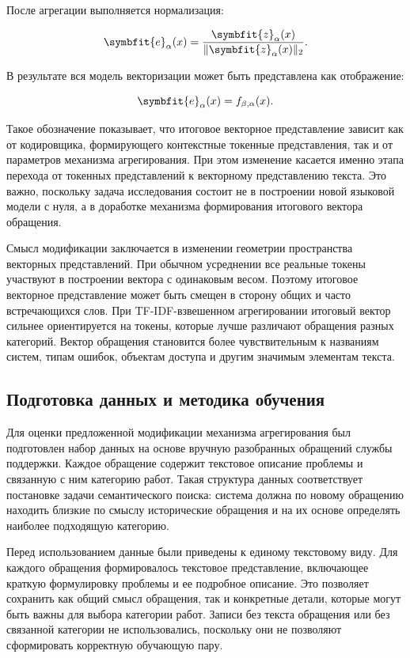 \documentclass[14pt,a4paper]{extarticle}
\numberwithin{figure}{section}
\numberwithin{table}{section}
\begin{document}
После агрегации выполняется нормализация:

\begin{equation}\symbfit{e}_{\alpha}(x)=\frac{\symbfit{z}_{\alpha}(x)}{\|\symbfit{z}_{\alpha}(x)\|_2}.\end{equation}

В результате вся модель векторизации может быть представлена как
отображение:

\begin{equation}\symbfit{e}_{\alpha}(x)=f_{\beta,\alpha}(x).\end{equation}

Такое обозначение показывает, что итоговое векторное представление зависит как от
кодировщика, формирующего контекстные токенные представления, так и от
параметров механизма агрегирования. При этом изменение касается именно этапа
перехода от токенных представлений к векторному представлению текста. Это важно,
поскольку задача исследования состоит не в построении новой языковой
модели с нуля, а в доработке механизма формирования итогового вектора
обращения.

Смысл модификации заключается в изменении геометрии
пространства векторных представлений. При обычном усреднении все реальные токены
участвуют в построении вектора с одинаковым весом. Поэтому итоговое
векторное представление может быть смещен в сторону общих и часто встречающихся слов.
При TF-IDF-взвешенном агрегировании итоговый вектор сильнее ориентируется на
токены, которые лучше различают обращения разных категорий. Вектор
обращения становится более чувствительным к названиям систем, типам
ошибок, объектам доступа и другим значимым элементам текста.

\subsection{Подготовка данных и методика
обучения}

Для оценки предложенной модификации механизма агрегирования был подготовлен
набор данных на основе вручную разобранных обращений службы поддержки.
Каждое обращение содержит текстовое описание проблемы и связанную с ним
категорию работ. Такая структура данных соответствует постановке задачи
семантического поиска: система должна по новому обращению находить
близкие по смыслу исторические обращения и на их основе определять
наиболее подходящую категорию.

Перед использованием данные были приведены к единому текстовому виду.
Для каждого обращения формировалось текстовое представление, включающее
краткую формулировку проблемы и ее подробное описание. Это позволяет
сохранить как общий смысл обращения, так и конкретные детали, которые
могут быть важны для выбора категории работ. Записи без текста обращения
или без связанной категории не использовались, поскольку они не
позволяют сформировать корректную обучающую пару.
\end{document}
